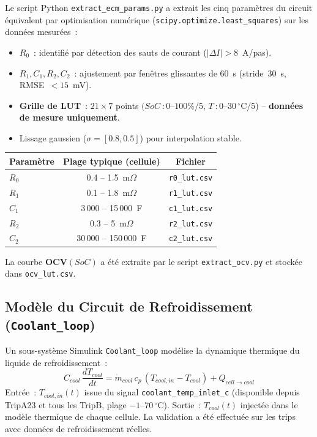 \documentclass[a4paper,11pt]{article}
\begin{document}
Le script Python \texttt{extract\_ecm\_params.py} a extrait les cinq paramètres
du circuit équivalent par optimisation numérique (\texttt{scipy.optimize.least\_squares})
sur les données mesurées~:

\begin{itemize}[nosep]
  \item \textbf{$R_0$}~: identifié par détection des sauts de courant
    ($|\Delta I| > 8$~A/pas).
  \item \textbf{$R_1, C_1, R_2, C_2$}~: ajustement par fenêtres glissantes de
    60~s (stride~30~s, RMSE~$<15$~mV).
  \item \textbf{Grille de LUT}~: $21 \times 7$ points $(SoC~: 0$--$100\%$/5, $T~: 0$--$30\,^\circ$C/5) -- \textbf{données de mesure uniquement}.
  \item Lissage gaussien ($\sigma = [0.8, 0.5]$) pour interpolation stable.
\end{itemize}

\begin{center}
\small\renewcommand{\arraystretch}{1.3}
\begin{tabular}{lcc}
\toprule
\textbf{Paramètre} & \textbf{Plage typique (cellule)} & \textbf{Fichier} \\
\midrule
$R_0$ & 0.4 -- 1.5~m$\Omega$ & \texttt{r0\_lut.csv} \\
$R_1$ & 0.1 -- 1.8~m$\Omega$ & \texttt{r1\_lut.csv} \\
$C_1$ & 3\,000 -- 15\,000~F & \texttt{c1\_lut.csv} \\
$R_2$ & 0.3 -- 5~m$\Omega$ & \texttt{r2\_lut.csv} \\
$C_2$ & 30\,000 -- 150\,000~F & \texttt{c2\_lut.csv} \\
\bottomrule
\end{tabular}
\end{center}

La courbe \textbf{OCV$(SoC)$} a été extraite par le script \texttt{extract\_ocv.py}
et stockée dans \texttt{ocv\_lut.csv}.

\subsection{Modèle du Circuit de Refroidissement (\texttt{Coolant\_loop})}

Un sous-système Simulink \texttt{Coolant\_loop} modélise la dynamique thermique
du liquide de refroidissement~:
\[
  C_{cool}\,\frac{dT_{cool}}{dt}
  = \dot{m}_{cool}\,c_p\,(T_{cool,in} - T_{cool}) + Q_{cell \to cool}
\]
Entrée~: $T_{cool,in}(t)$ issue du signal \texttt{coolant\_temp\_inlet\_c}
(disponible depuis TripA23 et tous les TripB, plage $-1$--$70\,^\circ$C).
Sortie~: $T_{cool}(t)$ injectée dans le modèle thermique de chaque cellule.
La validation a été effectuée sur les trips avec données de refroidissement réelles.
\end{document}
